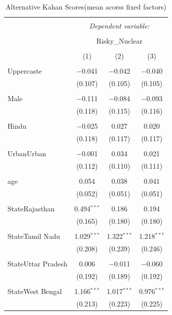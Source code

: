 \documentclass[
]{article}
\begin{document}
\begin{table}[!htbp] \centering 
  \caption{Alternative Kahan Scores(mean acorss fixed factors)} 
  \label{} 
\begin{tabular}{@{\extracolsep{5pt}}lccc} 
\\[-1.8ex]\hline 
\hline \\[-1.8ex] 
 & \multicolumn{3}{c}{\textit{Dependent variable:}} \\ 
\cline{2-4} 
\\[-1.8ex] & \multicolumn{3}{c}{Risky\_Nuclear} \\ 
\\[-1.8ex] & (1) & (2) & (3)\\ 
\hline \\[-1.8ex] 
 Uppercaste & $-$0.041 & $-$0.042 & $-$0.040 \\ 
  & (0.107) & (0.105) & (0.105) \\ 
  & & & \\ 
 Male & $-$0.111 & $-$0.084 & $-$0.093 \\ 
  & (0.118) & (0.115) & (0.116) \\ 
  & & & \\ 
 Hindu & $-$0.025 & 0.027 & 0.020 \\ 
  & (0.118) & (0.117) & (0.117) \\ 
  & & & \\ 
 UrbanUrban & $-$0.001 & 0.034 & 0.021 \\ 
  & (0.112) & (0.110) & (0.111) \\ 
  & & & \\ 
 age & 0.054 & 0.038 & 0.041 \\ 
  & (0.052) & (0.051) & (0.051) \\ 
  & & & \\ 
 StateRajasthan & 0.494$^{***}$ & 0.186 & 0.194 \\ 
  & (0.165) & (0.180) & (0.180) \\ 
  & & & \\ 
 StateTamil Nadu & 1.029$^{***}$ & 1.322$^{***}$ & 1.218$^{***}$ \\ 
  & (0.208) & (0.239) & (0.246) \\ 
  & & & \\ 
 StateUttar Pradesh & 0.006 & $-$0.011 & $-$0.060 \\ 
  & (0.192) & (0.189) & (0.192) \\ 
  & & & \\ 
 StateWest Bengal & 1.166$^{***}$ & 1.017$^{***}$ & 0.976$^{***}$ \\ 
  & (0.213) & (0.223) & (0.225) \\ 

\end{tabular}
\end{table}
\end{document}
